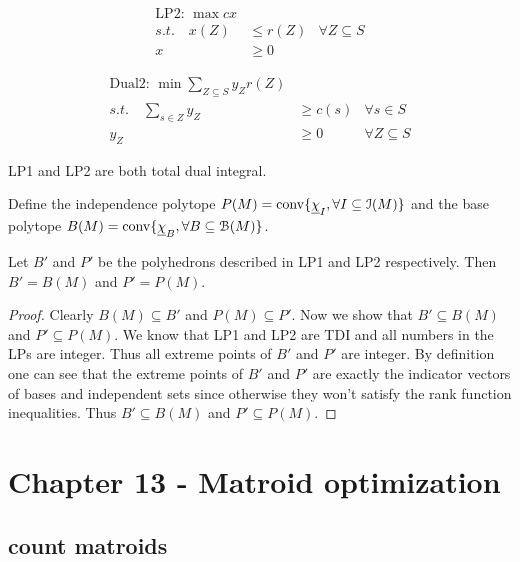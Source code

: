 \documentclass[12pt]{article}
\begin{document}
\begin{minipage}{.45\textwidth}
\begin{align*}
    \text{LP2: } \max  cx\\
    s.t. \quad x(Z)&\leq r(Z) &\forall Z \subseteq S\\
                x&\geq 0
\end{align*}
\end{minipage}
\begin{minipage}{.45\textwidth}
    \begin{align*}
        \text{Dual2: } \min \sum_{Z\subseteq S} y_Z r(Z)\\
        s.t. \quad \sum_{s\in Z}y_Z&\geq c(s) & \forall s\in S\\
        y_Z&\geq 0 & \forall Z\subseteq S
    \end{align*}
\end{minipage}

LP1 and LP2 are both total dual integral.

Define the independence polytope $P(M)=\operatorname{conv}\{\underline{\chi}_I, \forall I\subseteq \mathcal I(M)\}$ and the base polytope $B(M)=\operatorname{conv}\{\underline{\chi}_B, \forall B\subseteq \mathcal B(M)\}$.

\begin{theorem}[5.5.8]
    Let $B'$ and $P'$ be the polyhedrons described in LP1 and LP2 respectively. Then $B'=B(M)$ and $P'=P(M)$.
\end{theorem}
\begin{proof}
    Clearly $B(M)\subseteq B'$ and $P(M)\subseteq P'$. Now we show that $B'\subseteq B(M)$ and $P'\subseteq P(M)$. We know that LP1 and LP2 are TDI and all numbers in the LPs are integer. Thus all extreme points of $B'$ and $P'$ are integer. By definition one can see that the extreme points of $B'$ and $P'$ are exactly the indicator vectors of bases and independent sets since otherwise they won't satisfy the rank function inequalities. Thus $B'\subseteq B(M)$ and $P'\subseteq P(M)$.
\end{proof}


\section{Chapter 13 - Matroid optimization}
\subsection{count matroids}



\newpage


\end{document}
